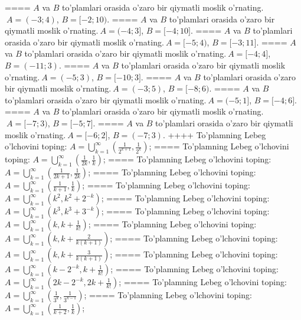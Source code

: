 ====
\(A\) va \(B\) to'plamlari orasida o'zaro bir qiymatli moslik o'rnating.\(\ A = ( - 3;4)\), \(B = \lbrack - 2;10)\).
====
\(A\) va \(B\) to'plamlari orasida o'zaro bir qiymatli moslik o'rnating.\(\ A = ( - 4;3\rbrack\), \(B = \lbrack - 4;10\rbrack\).
====
\(A\) va \(B\) to'plamlari orasida o'zaro bir qiymatli moslik o'rnating.\(\ A = \lbrack - 5;4)\), \(B = \lbrack - 3;11\rbrack\).
====
\(A\) va \(B\) to'plamlari orasida o'zaro bir qiymatli moslik o'rnating.\(\ A = \lbrack - 4;4\rbrack\), \(B = ( - 11;3)\).
====
\(A\) va \(B\) to'plamlari orasida o'zaro bir qiymatli moslik o'rnating.\(\ A = ( - 5;3)\), \(B = \lbrack - 10;3\rbrack\).
====
\(A\) va \(B\) to'plamlari orasida o'zaro bir qiymatli moslik o'rnating.\(\ A = ( - 3;5)\), \(B = \lbrack - 8;6)\).
====
\(A\) va \(B\) to'plamlari orasida o'zaro bir qiymatli moslik o'rnating.\(\ A = ( - 5;1\rbrack\), \(B = \lbrack - 4;6\rbrack\).
====
\(A\) va \(B\) to'plamlari orasida o'zaro bir qiymatli moslik o'rnating.\(\ A = \lbrack - 7;3)\), \(B = \lbrack - 5;7\rbrack\).
====
\(A\) va \(B\) to'plamlari orasida o'zaro bir qiymatli moslik o'rnating.\(\ A = \lbrack - 6;2\rbrack\), \(B = ( - 7;3)\).
++++
To'plamning Lebeg o'lchovini toping: \(A = \bigcup_{k = 1}^{\infty}\left( \frac{1}{2^{k + 1}},\frac{1}{2^{k}} \right)\);
====
To'plamning Lebeg o'lchovini toping: \(A = \bigcup_{k = 1}^{\infty}\left( \frac{1}{2k},\frac{1}{k} \right)\);
====
To'plamning Lebeg o'lchovini toping: \(A = \bigcup_{k = 1}^{\infty}\left( \frac{1}{2k + 1},\frac{1}{2k} \right)\);
====
To'plamning Lebeg o'lchovini toping: \(A = \bigcup_{k = 1}^{\infty}\left( \frac{1}{k + 1},\frac{1}{k} \right)\);
====
To'plamning Lebeg o'lchovini toping: \(A = \bigcup_{k = 1}^{\infty}\left( k^{2},k^{2} + 2^{- k} \right)\);
====
To'plamning Lebeg o'lchovini toping: \(A = \bigcup_{k = 1}^{\infty}\left( k^{3},k^{3} + 3^{- k} \right)\);
====
To'plamning Lebeg o'lchovini toping: \(A = \bigcup_{k = 1}^{\infty}\left( k,k + \frac{1}{k!} \right)\);
====
To'plamning Lebeg o'lchovini toping: \(A = \bigcup_{k = 1}^{\infty}\left( k,k + \frac{2}{k(k + 1)} \right)\);
====
To'plamning Lebeg o'lchovini toping: \(A = \bigcup_{k = 1}^{\infty}\left( k,k + \frac{3}{k(k + 1)} \right)\);
====
To'plamning Lebeg o'lchovini toping: \(A = \bigcup_{k = 1}^{\infty}\left( k - 2^{- k},k + \frac{1}{k!} \right)\);
====
To'plamning Lebeg o'lchovini toping: \(A = \bigcup_{k = 1}^{\infty}\left( 2k - 2^{- k},2k + \frac{1}{k!} \right)\);
====
To'plamning Lebeg o'lchovini toping: \(A = \bigcup_{k = 1}^{\infty}\left( \frac{1}{3^{k}},\frac{1}{3^{k - 1}} \right)\);
====
To'plamning Lebeg o'lchovini toping: \(A = \bigcup_{k = 1}^{\infty}\left( \frac{1}{k + 2},\frac{1}{k} \right)\);
